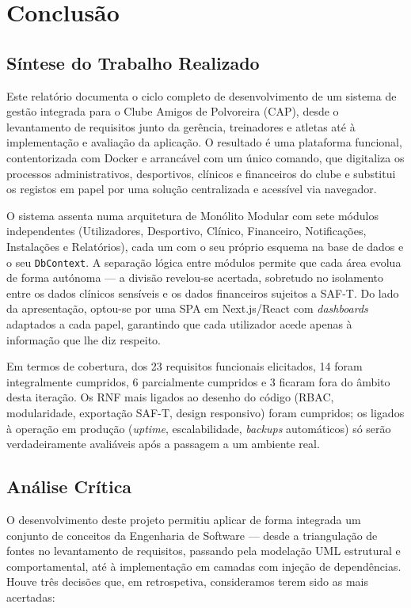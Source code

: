 \chapter{Conclusão}\label{chap:conclusao}

\section{Síntese do Trabalho Realizado}

Este relatório documenta o ciclo completo de desenvolvimento de um sistema de gestão integrada para o Clube Amigos de Polvoreira (CAP), desde o levantamento de requisitos junto da gerência, treinadores e atletas até à implementação e avaliação da aplicação. O resultado é uma plataforma funcional, contentorizada com Docker e arrancável com um único comando, que digitaliza os processos administrativos, desportivos, clínicos e financeiros do clube e substitui os registos em papel por uma solução centralizada e acessível via navegador.

O sistema assenta numa arquitetura de Monólito Modular com sete módulos independentes (Utilizadores, Desportivo, Clínico, Financeiro, Notificações, Instalações e Relatórios), cada um com o seu próprio esquema na base de dados e o seu \texttt{DbContext}. A separação lógica entre módulos permite que cada área evolua de forma autónoma --- a divisão revelou-se acertada, sobretudo no isolamento entre os dados clínicos sensíveis e os dados financeiros sujeitos a SAF-T. Do lado da apresentação, optou-se por uma SPA em Next.js/React com \textit{dashboards} adaptados a cada papel, garantindo que cada utilizador acede apenas à informação que lhe diz respeito.

Em termos de cobertura, dos 23 requisitos funcionais elicitados, 14 foram integralmente cumpridos, 6 parcialmente cumpridos e 3 ficaram fora do âmbito desta iteração. Os RNF mais ligados ao desenho do código (RBAC, modularidade, exportação SAF-T, design responsivo) foram cumpridos; os ligados à operação em produção (\textit{uptime}, escalabilidade, \textit{backups} automáticos) só serão verdadeiramente avaliáveis após a passagem a um ambiente real.

\section{Análise Crítica}

O desenvolvimento deste projeto permitiu aplicar de forma integrada um conjunto de conceitos da Engenharia de Software --- desde a triangulação de fontes no levantamento de requisitos, passando pela modelação UML estrutural e comportamental, até à implementação em camadas com injeção de dependências. Houve três decisões que, em retrospetiva, consideramos terem sido as mais acertadas:

